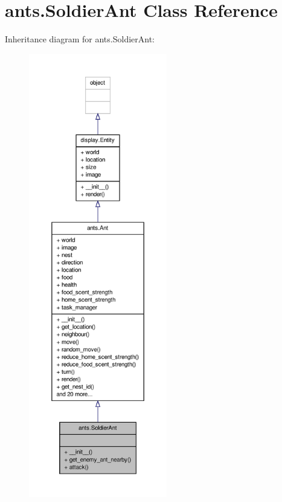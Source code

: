 \hypertarget{classants_1_1SoldierAnt}{\section{ants.\+Soldier\+Ant Class Reference}
\label{classants_1_1SoldierAnt}
}


Inheritance diagram for ants.\+Soldier\+Ant\+:
\nopagebreak
\begin{figure}[H]
\begin{center}
\leavevmode
\includegraphics[height=550pt]{classants_1_1SoldierAnt__inherit__graph}
\end{center}
\end{figure}


